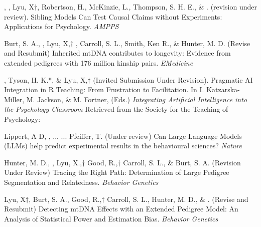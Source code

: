 
\item \meb, \jt, Lyu, X$\dagger$, Robertson, H.\noteA, McKinzie, L.\noteA, Thompson, S. H. E.\noteA, \& \joe. (revision under review). Sibling Models Can Test Causal Claims without Experiments: Applications for Psychology. \href{https://osf.io/zpdwt/}{\small\color{blue}{osf.io/zpdwt/}} \textit{AMPPS} %

\item Burt, S. A., \meb, Lyu, X,$\dagger$ \joe, Carroll, S. L., Smith, Ken R., \& Hunter, M. D. (Revise and Resubmit) Inherited mtDNA contributes to longevity: Evidence from extended pedigrees with 176 million kinship pairs. \textit{EMedicine}%

\item \meb, Tyson, H. K.*, \& Lyu, X,$\dagger$ (Invited Submission Under Revision). Pragmatic AI Integration in R Teaching: From Frustration to Facilitation.  In I. Katzarska-Miller, M. Jackson, \& M. Fortner,  (Eds.) \textit{Integrating Artificial Intelligence into the Psychology Classroom} Retrieved from the Society for the Teaching of Psychology: \href{http://teachpsych.org/ebooks/}{\small\color{blue}{teachpsych.org/ebooks/}}

\item Lippert, A D, , ... \meb ... Pfeiffer, T. (Under review) Can Large Language Models (LLMs) help predict experimental results in the behavioural sciences? \textit{Nature}

\item Hunter, M. D., \meb, Lyu, X.,$\dagger$ Good, R.,$\dagger$ Carroll, S. L., \& Burt, S. A. (Revision Under Review) Tracing the Right Path: Determination of Large Pedigree Segmentation and Relatedness. \textit{Behavior Genetics}

\item Lyu, X$\dagger$, Burt, S. A., Good, R.,$\dagger$ Carroll, S. L.,  Hunter, M. D., \& \meb. (Revise and Resubmit) Detecting mtDNA Effects with an Extended Pedigree Model: An Analysis of Statistical Power and Estimation Bias. %
\textit{Behavior Genetics}

